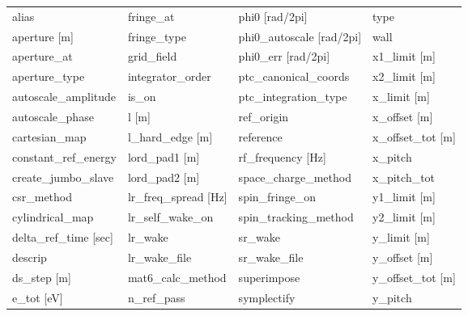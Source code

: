  \begin{tabular}{llll} \toprule
alias                          & fringe_at                      & phi0 [rad/2pi]                 & type                           \\
aperture [m]                   & fringe_type                    & phi0_autoscale [rad/2pi]       & wall                           \\
aperture_at                    & grid_field                     & phi0_err [rad/2pi]             & x1_limit [m]                   \\
aperture_type                  & integrator_order               & ptc_canonical_coords           & x2_limit [m]                   \\
autoscale_amplitude            & is_on                          & ptc_integration_type           & x_limit [m]                    \\
autoscale_phase                & l [m]                          & ref_origin                     & x_offset [m]                   \\
cartesian_map                  & l_hard_edge [m]                & reference                      & x_offset_tot [m]               \\
constant_ref_energy            & lord_pad1 [m]                  & rf_frequency [Hz]              & x_pitch                        \\
create_jumbo_slave             & lord_pad2 [m]                  & space_charge_method            & x_pitch_tot                    \\
csr_method                     & lr_freq_spread [Hz]            & spin_fringe_on                 & y1_limit [m]                   \\
cylindrical_map                & lr_self_wake_on                & spin_tracking_method           & y2_limit [m]                   \\
delta_ref_time [sec]           & lr_wake                        & sr_wake                        & y_limit [m]                    \\
descrip                        & lr_wake_file                   & sr_wake_file                   & y_offset [m]                   \\
ds_step [m]                    & mat6_calc_method               & superimpose                    & y_offset_tot [m]               \\
e_tot [eV]                     & n_ref_pass                     & symplectify                    & y_pitch                        \\

\end{tabular}
